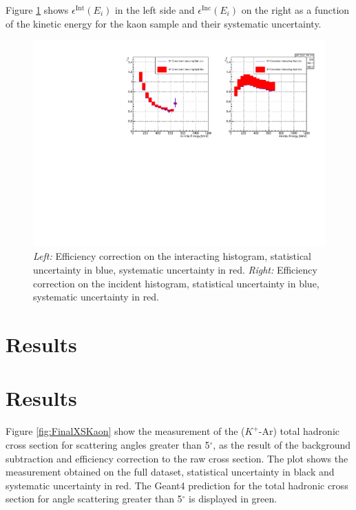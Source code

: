 Figure \ref{fig:EffCorrK} shows $\epsilon^{\text{Int}}(E_{i})$ in the left side and $ \epsilon^{\text{Inc}}(E_i)$ on the right as a function of the kinetic energy for the kaon sample and their systematic uncertainty. 


\begin{figure}
\centering
\includegraphics[width=\textwidth]{Chapter-7/Images/EffCorrK.pdf}
\caption{\emph{Left:} Efficiency correction on the interacting histogram, statistical uncertainty in blue, systematic uncertainty in red. \emph{Right:}  Efficiency correction on the incident histogram, statistical uncertainty in blue, systematic uncertainty in red.}
\label{fig:EffCorrK}
\end{figure}



\section{Results}\label{ch:FinalKaon}
\section{Results}\label{ch:FinalKaon}
Figure \ref{fig:FinalXSKaon} show the measurement of the ($K^+$-Ar) total hadronic cross section for  scattering angles greater than 5$^\circ$, as the result of the background subtraction and efficiency correction to the raw cross section. The plot shows the measurement obtained on the full dataset, statistical uncertainty in black and systematic uncertainty in red. The Geant4 prediction for the total hadronic cross section for angle scattering greater than 5$^\circ$ is displayed in green.

